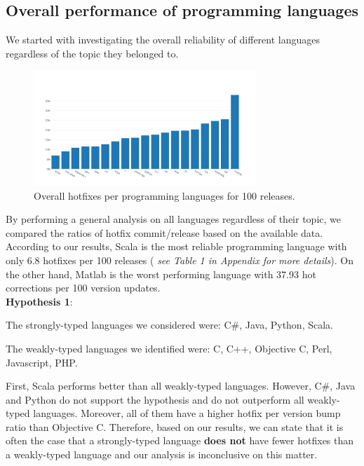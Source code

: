 \subsection{Overall performance of programming languages}
We started with investigating the overall reliability of different languages regardless of the topic they belonged to.\\
\begin{figure}
\centering
\includegraphics[width=0.75\textwidth]{Bar_chart}
\caption{Overall hotfixes per programming languages for 100 releases.}
\label{fig:my_label}
\end{figure}

\par
By performing a general analysis on all languages regardless of their topic, we compared the ratios of hotfix commit/release based on the available data. According to our results, Scala is the most reliable programming language with only 6.8 hotfixes per 100 releases ( \textit{see Table 1 in Appendix for more details}). On the other hand, Matlab is the worst performing language with 37.93 hot corrections per 100 version updates.\\

\textbf{Hypothesis 1}:\par
The strongly-typed languages we considered were: C\#, Java, Python, Scala.\par
The weakly-typed languages we identified were: C, C++, Objective C, Perl, Javascript, PHP.\par

First, Scala performs better than all weakly-typed languages. However, C\#, Java and Python do not support the hypothesis and do not outperform all weakly-typed languages. Moreover, all of them have a higher hotfix per version bump ratio than Objective C. Therefore, based on our results, we can state that it is often the case that a strongly-typed language \textbf{does not} have fewer hotfixes than a weakly-typed language and our analysis is inconclusive on this matter.\\

